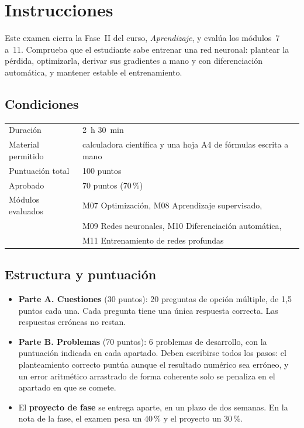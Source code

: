 \chapter*{Instrucciones}

Este examen cierra la Fase~II del curso, \emph{Aprendizaje}, y evalúa los módulos~7 a~11. Comprueba que el estudiante sabe entrenar una red neuronal: plantear la pérdida, optimizarla, derivar sus gradientes a mano y con diferenciación automática, y mantener estable el entrenamiento.

\section*{Condiciones}
\begin{center}
\begin{tabular}{@{}ll@{}}
\toprule
Duración & 2~h 30~min \\
Material permitido & calculadora científica y una hoja A4 de fórmulas escrita a mano \\
Puntuación total & 100 puntos \\
Aprobado & 70 puntos (70\,\%) \\
Módulos evaluados & M07 Optimización, M08 Aprendizaje supervisado, \\
 & M09 Redes neuronales, M10 Diferenciación automática, \\
 & M11 Entrenamiento de redes profundas \\
\bottomrule
\end{tabular}
\end{center}

\section*{Estructura y puntuación}
\begin{itemize}[leftmargin=1.4em]
  \item \textbf{Parte A. Cuestiones} (30 puntos): 20 preguntas de opción múltiple, de 1,5 puntos cada una. Cada pregunta tiene una única respuesta correcta. Las respuestas erróneas no restan.
  \item \textbf{Parte B. Problemas} (70 puntos): 6 problemas de desarrollo, con la puntuación indicada en cada apartado. Deben escribirse todos los pasos: el planteamiento correcto puntúa aunque el resultado numérico sea erróneo, y un error aritmético arrastrado de forma coherente solo se penaliza en el apartado en que se comete.
  \item El \textbf{proyecto de fase} se entrega aparte, en un plazo de dos semanas. En la nota de la fase, el examen pesa un 40\,\% y el proyecto un 30\,\%.
\end{itemize}

